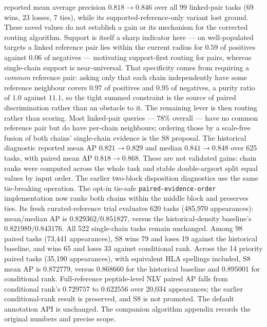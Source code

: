 \documentclass[11pt]{article}
\theoremstyle{oldplain}
\theoremstyle{oldrem}
\begin{document}
reported mean average precision $0.818\to0.846$ over all $99$ linked-pair tasks
($69$ wins, $23$ losses, $7$ ties), while its supported-reference-only variant lost ground.
These saved values do not establish a gain or its mechanism for the corrected routing algorithm. Support is itself a sharp indicator here --- on
well-populated targets a linked reference pair lies within the current radius for $0.59$ of
positives against $0.06$ of negatives --- motivating support-first routing for pairs,
whereas single-chain support is near-universal. That specificity comes
from requiring a \emph{common} reference pair: asking only that each chain independently have some
reference neighbour covers $0.97$ of positives and $0.95$ of negatives, a purity ratio of $1.0$
against $11.1$, so the tight summed constraint is the source of paired discrimination rather than an
obstacle to it. The remaining lever is then routing rather than scoring. Most linked-pair queries
--- $78\%$ overall --- have no common reference pair but do have per-chain neighbours; ordering
those by a scale-free fusion of both chains' single-chain evidence is the S8 proposal.
The historical diagnostic reported mean AP $0.821\to0.829$ and median $0.841\to0.848$ over 625
tasks, with paired mean AP $0.818\to0.868$. These are not validated gains: chain ranks were
computed across the whole task and stable double-argsort split equal values by input order.
The earlier two-block disposition diagnostics use the same tie-breaking operation.
The opt-in tie-safe \texttt{paired-evidence-order} implementation now ranks both chains
within the middle block and preserves ties. Its fresh curated-reference trial evaluates 620 tasks
(485,970 appearances): mean/median AP is $0.829362/0.851827$, versus the historical-density
baseline's $0.821989/0.843176$. All 522 single-chain tasks remain unchanged. Among 98 paired tasks
(73,441 appearances), S8 wins 79 and loses 19 against the historical baseline, and wins 65 and
loses 33 against conditional rank. Across the 14 priority paired tasks (35,190 appearances),
with equivalent HLA spellings included, S8 mean AP is $0.872779$, versus $0.868660$ for the
historical baseline and $0.895001$ for conditional rank. Full-reference peptide-level NLV paired AP falls from
conditional rank's $0.729757$ to $0.622556$ over 20,034 appearances; the earlier conditional-rank
result is preserved, and S8 is not promoted. The default annotation API is unchanged. The companion algorithm appendix records the original numbers and precise scope.
\end{document}
